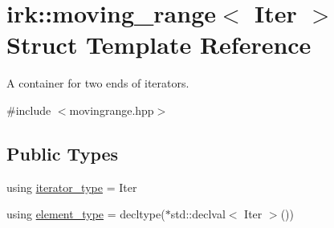 \hypertarget{structirk_1_1moving__range}{}\section{irk\+:\+:moving\+\_\+range$<$ Iter $>$ Struct Template Reference}
\label{structirk_1_1moving__range}


A container for two ends of iterators.  




{\ttfamily \#include $<$movingrange.\+hpp$>$}

\subsection*{Public Types}
\begin{DoxyCompactItemize}
\item 
using \mbox{\hyperlink{structirk_1_1moving__range_ad77e99c581516edfaae4cdb3cc6793ba}{iterator\+\_\+type}} = Iter
\item 
using \mbox{\hyperlink{structirk_1_1moving__range_a53b63b6f5e9e758aab935274c09355de}{element\+\_\+type}} = decltype($\ast$std\+::declval$<$ Iter $>$())
\end{DoxyCompactItemize}
